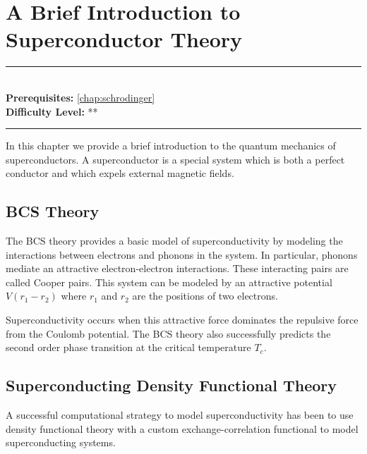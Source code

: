 \documentclass[book.tex]{subfiles}
\begin{document}
\chapter{A Brief Introduction to Superconductor Theory}

\label{chap:superconductors}
\noindent\rule{11cm}{0.4pt} \\
\textbf{Prerequisites:}  \autoref{chap:schrodinger} \\
\textbf{Difficulty Level:} ** \\
\noindent\rule{11cm}{0.4pt}
\vspace{5mm}

In this chapter we provide a brief introduction to the quantum mechanics of superconductors. A superconductor is a special system which is both a perfect conductor and which expels external magnetic fields.


\section{BCS Theory}
The BCS theory provides a basic model of superconductivity by modeling the interactions between electrons and phonons in the system. In particular, phonons mediate an attractive electron-electron interactions. These interacting pairs are called Cooper pairs. This system can be modeled by an attractive potential $V(r_1 - r_2)$ where $r_1$ and $r_2$ are the positions of two electrons.

Superconductivity occurs when this attractive force dominates the repulsive force from the Coulomb potential. The BCS theory also successfully predicts the second order phase transition at the critical temperature $T_c$.

\section{Superconducting Density Functional Theory}

A successful computational strategy to model superconductivity has been to use density functional theory with a custom exchange-correlation functional to model superconducting systems.

\end{document}
